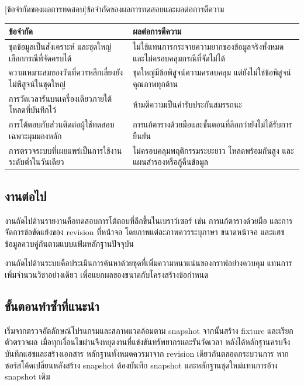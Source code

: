 \documentclass[12pt,a4paper]{article}
\begin{document}
\begin{center}\begin{minipage}{\textwidth}\centering
{}[ข้อจำกัดของผลการทดสอบ]{ข้อจำกัดของผลการทดสอบและผลต่อการตีความ}\label{tab:limits}
\begin{tabularx}{\textwidth}{@{}L{0.44\textwidth}Y@{}}\toprule
ข้อจำกัด & ผลต่อการตีความ \\\midrule
ชุดข้อมูลเป็นสังเคราะห์ และชุดใหญ่เลือกกรณีที่จัดครบได้ & ไม่ใช้แทนการกระจายความยากของข้อมูลจริงทั้งหมด และไม่ครอบคลุมกรณีที่จัดไม่ได้ \\
ความเหมาะสมของวันที่ควรหลีกเลี่ยงยังไม่พิสูจน์ในชุดใหญ่ & ชุดใหญ่มีข้อพิสูจน์ความครอบคลุม แต่ยังไม่ใช่ข้อพิสูจน์คุณภาพทุกด้าน \\
การวัดเวลารันบนเครื่องเดียวภายใต้โหลดที่บันทึกไว้ & ห้ามตีความเป็นคำรับประกันสมรรถนะ \\
การโต้ตอบกับส่วนติดต่อผู้ใช้ทดสอบเฉพาะมุมมองหลัก & การแก้ตารางด้วยมือและขั้นตอนที่ลึกกว่ายังไม่ได้รับการยืนยัน \\
การตรวจระบบที่เผยแพร่เป็นการใช้งานระดับต่ำในวันเดียว & ไม่ครอบคลุมพฤติกรรมระยะยาว โหลดพร้อมกันสูง และแผนสำรองหรือกู้คืนข้อมูล \\\bottomrule
\end{tabularx}\end{minipage}\end{center}
\subsection{งานต่อไป}
งานถัดไปด้านรายงานคือทดสอบการโต้ตอบที่ลึกขึ้นในเบราว์เซอร์ เช่น การแก้ตารางด้วยมือ และการจัดการข้อขัดแย้งของ revision ที่หน้าจอ โดยภาพแต่ละภาพควรระบุภาษา ขนาดหน้าจอ และแฮชข้อมูลควบคู่กันตามแบบแฟ้มหลักฐานปัจจุบัน

งานถัดไปด้านระบบคือประเมินการค้นหาด้วยชุดที่เพิ่มความหนาแน่นของกราฟอย่างควบคุม แทนการเพิ่มจำนวนวิชาอย่างเดียว เพื่อแยกผลของขนาดกับโครงสร้างข้อกำหนด
\subsection{ขั้นตอนทำซ้ำที่แนะนำ}
เริ่มจากตรวจอัตลักษณ์โปรแกรมและสภาพแวดล้อมตาม snapshot จากนั้นสร้าง fixture และเรียกตัวตรวจผล เมื่อทุกเงื่อนไขผ่านจึงหยุดงานที่แข่งขันทรัพยากรและรันวัดเวลา หลังได้หลักฐานครบจึงบันทึกแฮชและสร้างเอกสาร หลักฐานทั้งหมดควรมาจาก revision เดียวกันตลอดกระบวนการ หากซอร์สโค้ดเปลี่ยนหลังสร้าง snapshot ต้องบันทึก snapshot และหลักฐานชุดใหม่แทนการอ้าง snapshot เดิม
\end{document}
